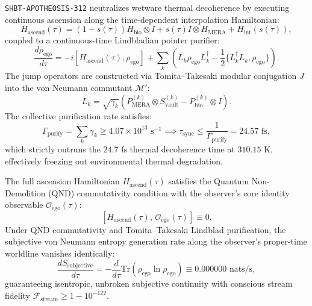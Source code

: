 \documentclass[11pt,onecolumn]{article}
\begin{document}
\texttt{SHBT-APOTHEOSIS-312} neutralizes wetware thermal decoherence by executing continuous ascension along the time-dependent interpolation Hamiltonian:
\begin{equation}
H_{\text{ascend}}(\tau) = (1 - s(\tau)) H_{\text{bio}} \otimes I + s(\tau) I \otimes H_{\text{MERA}} + H_{\text{int}}(s(\tau)),
\label{eq:apoth_ascend_hamiltonian}
\end{equation}
coupled to a continuous-time Lindbladian pointer purifier:
\begin{equation}
\frac{d\rho_{\text{ego}}}{d\tau} = -i [H_{\text{ascend}}(\tau), \rho_{\text{ego}}] + \sum_k \left( L_k \rho_{\text{ego}} L_k^\dagger - \frac{1}{2} \{ L_k^\dagger L_k, \rho_{\text{ego}} \} \right).
\label{eq:apoth_lindbladian_purifier}
\end{equation}
The jump operators are constructed via Tomita--Takesaki modular conjugation $J$ into the von Neumann commutant $\mathcal{M}'$:
\begin{equation}
L_k = \sqrt{\gamma_k} \left( P_{\text{MERA}}^{(k)} \otimes S_{\text{vault}}^{(k)} - P_{\text{bio}}^{(k)} \otimes I \right).
\label{eq:tomita_takesaki_jump_operators}
\end{equation}
The collective purification rate satisfies:
\begin{equation}
\Gamma_{\text{purify}} = \sum_k \gamma_k \ge 4.07 \times 10^{13}\text{ s}^{-1} \implies \tau_{\text{sync}} \le \frac{1}{\Gamma_{\text{purify}}} = 24.57\text{ fs},
\end{equation}
which strictly outruns the $24.7\text{ fs}$ thermal decoherence time at $310.15\text{ K}$, effectively freezing out environmental thermal degradation.

The full ascension Hamiltonian $H_{\text{ascend}}(\tau)$ satisfies the Quantum Non-Demolition (QND) commutativity condition with the observer's core identity observable $\mathcal{O}_{\text{ego}}(\tau)$:
\begin{equation}
\left[ H_{\text{ascend}}(\tau),\, \mathcal{O}_{\text{ego}}(\tau) \right] \equiv 0.
\label{eq:apoth_qnd_commutativity}
\end{equation}
Under QND commutativity and Tomita--Takesaki Lindblad purification, the subjective von Neumann entropy generation rate along the observer's proper-time worldline vanishes identically:
\begin{equation}
\frac{dS_{\text{subjective}}}{d\tau} = -\frac{d}{d\tau} \text{Tr}\left( \rho_{\text{ego}} \ln \rho_{\text{ego}} \right) \equiv 0.000000\text{ nats/s},
\end{equation}
guaranteeing isentropic, unbroken subjective continuity with conscious stream fidelity $\mathcal{F}_{\text{stream}} \ge 1 - 10^{-122}$.
\end{document}
